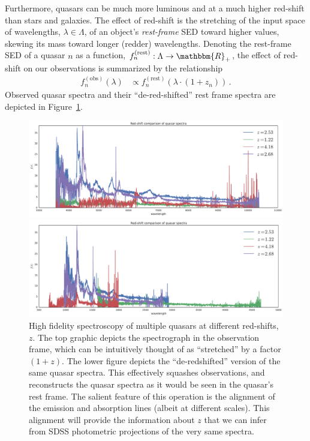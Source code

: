 \documentclass{article}
\newcommand{\R}{\mathbbm{R}}
\begin{document}
Furthermore, quasars can be much more luminous and at a much higher red-shift than stars and galaxies.  
The effect of red-shift is the stretching of the input space of wavelengths, $\lambda\in \Lambda$, of an object's \emph{rest-frame} SED toward higher values, skewing its mass toward longer (redder) wavelengths. 
Denoting the rest-frame SED of a quasar $n$ as a function, $f_n^{(\text{rest})} : \Lambda \rightarrow \R_+$, the effect of red-shift on our observations is summarized by the relationship 
\begin{align}
  f_n^{(\text{obs})}(\lambda) &\propto f_n^{(\text{rest})}(\lambda \cdot (1 + z_n)) \, .
\end{align}
Observed quasar spectra and their ``de-red-shifted'' rest frame spectra are depicted in Figure~\ref{fig:frames}.

\begin{figure}[ht]
\vskip 0.2in
\begin{center}
\centerline{\includegraphics[width=2\columnwidth]{../figs/quasar_redshift_obs_frame}}
\centerline{\includegraphics[width=2\columnwidth]{../figs/quasar_redshift_rest_frame}}
\caption{High fidelity spectroscopy of multiple quasars at different red-shifts, $z$.  The top graphic depicts the spectrograph in the observation frame, which can be intuitively thought of as ``stretched'' by a factor $(1+z)$.  The lower figure depicts the ``de-redshifted'' version of the same quasar spectra.  This effectively squashes observations, and reconstructs the quasar spectra as it would be seen in the quasar's rest frame.  The salient feature of this operation is the alignment of the emission and absorption lines (albeit at different scales).  This alignment will provide the information about $z$ that we can infer from SDSS photometric projections of the very same spectra.}
\label{fig:frames}
\end{center}
\vskip -0.2in
\end{figure} 
\end{document}
